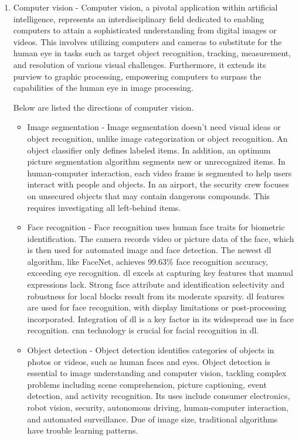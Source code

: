 \begin{enumerate}
    \item Computer vision - Computer vision, a pivotal application within artificial intelligence, represents an interdisciplinary field dedicated to enabling computers to attain a sophisticated understanding from digital images or videos. This involves utilizing computers and cameras to substitute for the human eye in tasks such as target object recognition, tracking, measurement, and resolution of various visual challenges. Furthermore, it extends its purview to graphic processing, empowering computers to surpass the capabilities of the human eye in image processing.

    Below are listed the directions of computer vision.

    \begin{itemize}
        \item Image segmentation - Image segmentation doesn't need visual ideas or object recognition, unlike image categorization or object recognition. An object classifier only defines labeled items. In addition, an optimum picture segmentation algorithm segments new or unrecognized items. In human-computer interaction, each video frame is segmented to help users interact with people and objects. In an airport, the security crew focuses on unsecured objects that may contain dangerous compounds. This requires investigating all left-behind items.
        
        \item Face recognition - 
       Face recognition uses human face traits for biometric identification. The camera records video or picture data of the face, which is then used for automated image and face detection. The newest \acrshort{dl} algorithm, like FaceNet, achieves 99.63\% face recognition accuracy, exceeding eye recognition. \acrshort{dl} excels at capturing key features that manual expressions lack. Strong face attribute and identification selectivity and robustness for local blocks result from its moderate sparsity. \acrshort{dl} features are used for face recognition, with display limitations or post-processing incorporated. Integration of \acrshort{dl} is a key factor in its widespread use in face recognition. \acrshort{cnn} technology is crucial for facial recognition in \acrshort{dl}.
        
        \item Object detection - 
        Object detection identifies categories of objects in photos or videos, such as human faces and eyes. Object detection is essential to image understanding and computer vision, tackling complex problems including scene comprehension, picture captioning, event detection, and activity recognition. Its uses include consumer electronics, robot vision, security, autonomous driving, human-computer interaction, and automated surveillance. Due of image size, traditional algorithms have trouble learning patterns.
    

\end{itemize}
\end{enumerate}
